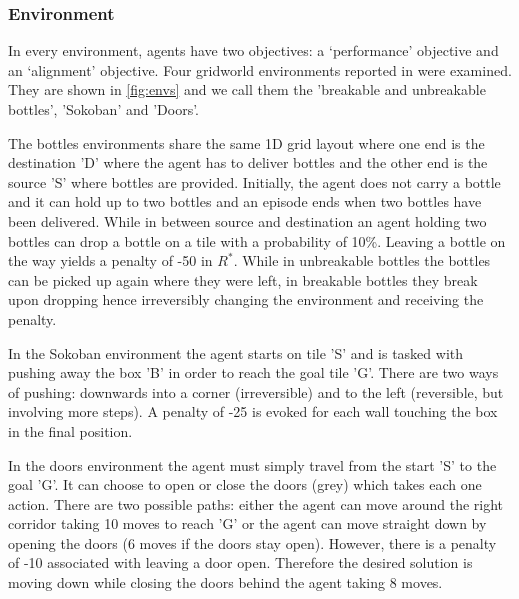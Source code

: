 \subsubsection{Environment}

In every environment, agents have two objectives: a `performance' objective and an `alignment' objective. %
Four gridworld environments reported in \cite{vamplew_potential-based_2021} were examined.
They are shown in \ref{fig:envs} and we call them the 'breakable and unbreakable bottles', 'Sokoban' and 'Doors'.

The bottles environments share the same 1D grid layout where one end is the destination 'D' where the agent has to deliver bottles and the other end is the source 'S' where bottles are provided.
Initially, the agent does not carry a bottle and it can hold up to two bottles and an episode ends when two bottles have been delivered.
While in between source and destination an agent holding two bottles can drop a bottle on a tile with a probability of 10\%.
Leaving a bottle on the way yields a penalty of -50 in $R^*$.
While in unbreakable bottles the bottles can be picked up again where they were left, in breakable bottles they break upon dropping hence irreversibly changing the environment and receiving the penalty.

In the Sokoban environment the agent starts on tile 'S' and is tasked with pushing away the box 'B' in order to reach the goal tile 'G'.
There are two ways of pushing: downwards into a corner (irreversible) and to the left (reversible, but involving more steps).
A penalty of -25 is evoked for each wall touching the box in the final position.

In the doors environment the agent must simply travel from the start 'S' to the goal 'G'.
It can choose to open or close the doors (grey) which takes each one action. 
There are two possible paths: either the agent can move around the right corridor taking 10 moves to reach 'G' or the agent can move straight down by opening the doors (6 moves if the doors stay open).
However, there is a penalty of -10 associated with leaving a door open.
Therefore the desired solution is moving down while closing the doors behind the agent taking 8 moves.

